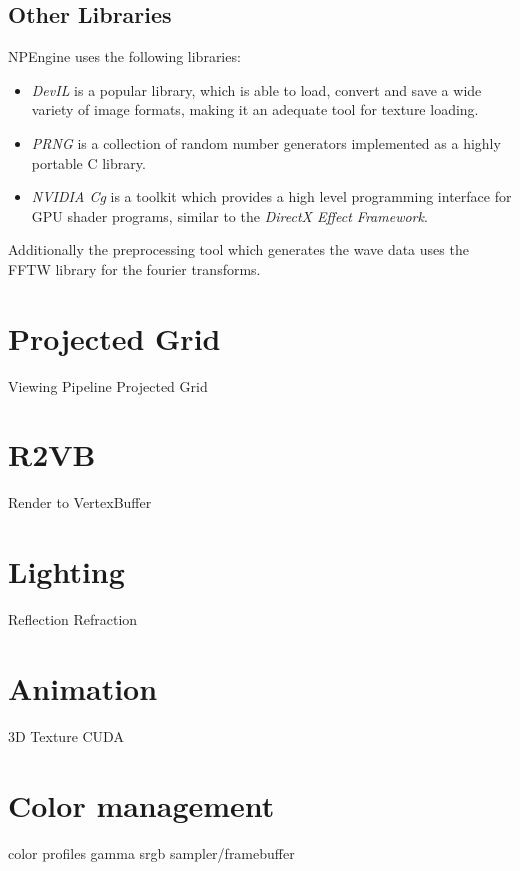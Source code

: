 \subsection{Other Libraries}

NPEngine uses the following libraries:

\begin{itemize}
 \item \textit{DevIL}\cite{misc:devil} is a popular library, which is able to
load, convert and save a wide variety of image formats, making it an adequate
tool for texture loading.
 \item \textit{PRNG}\cite{misc:prng} is a collection of random number generators
implemented as a highly portable C library.
 \item \textit{NVIDIA Cg}\cite{misc:nvcg} is a toolkit which provides a high
level programming interface for GPU shader programs, similar to the
\textit{DirectX Effect Framework}\cite{misc:directx}\cite{book:effect-hlsl}.
\end{itemize}

Additionally the preprocessing tool which generates the wave data uses the FFTW
library\cite{misc:fftw} for the fourier transforms.

\section{Projected Grid}
Viewing Pipeline
Projected Grid

\section{R2VB}
Render to VertexBuffer

\section{Lighting}
Reflection
Refraction

\section{Animation}
3D Texture
CUDA

\section{Color management}
color profiles
gamma
srgb sampler/framebuffer